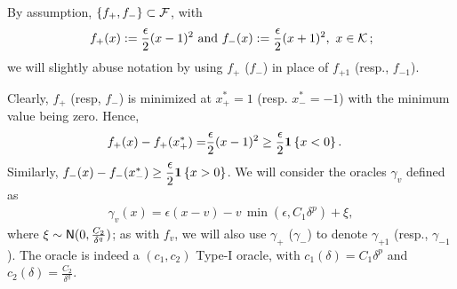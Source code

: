 By assumption,  $\{f_+, f_-\}\subset \mathcal{F}$, with 
\begin{align*}
  f_+(x) := \dfrac{\epsilon}{2} (x - 1)^2 \text{ and } f_-(x) := \dfrac{\epsilon}{2} (x + 1)^2, \,\, x \in \mathcal{K}\,;
\end{align*}
we will slightly abuse notation by using $f_+$ ($f_-$) in place of $f_{+1}$ (resp., $f_{-1}$).

Clearly, $f_+$ (resp, $f_-$) is minimized at $x^*_+ = 1$ (resp. $x^*_- = -1$) with the minimum value being zero.
Hence,
\begin{align}
  f_+(x) - f_+(x^*_+)
  = &  \dfrac{\epsilon}{2} (x - 1)^2 \ge  \dfrac{\epsilon}{2}  \mathbf{1}\left\{x  < 0\right\}. \label{eq:fv-lb}
\end{align}
Similarly,   $f_-(x) - f_-(x^*_-) \ge  \dfrac{\epsilon}{2}  \mathbf{1}\left\{x  >0\right\}$.
We will consider the oracles $\gamma_v$ defined as 
\begin{align}
 \gamma_v(x) = \epsilon(x-v) - v\, \min(\epsilon,C_1 \delta^p) + \xi, \label{eq:oracle-1d}
\end{align}
where $\xi \sim \mathsf{N}(0,\frac{C_2}{\delta^q})$; as with $f_v$, we will also use $\gamma_{+}$ ($\gamma_-$) 
to denote $\gamma_{+1}$ (resp., $\gamma_{-1}$).
The oracle is indeed a $(c_1,c_2)$ Type-I oracle, with $c_1(\delta)=C_1\delta^p$ and $c_2(\delta)=\frac{C_2}{\delta^q}$.


